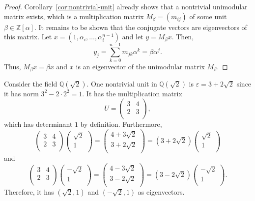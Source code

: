 \begin{proof}
  Corollary~\ref{cor:nontrivial-unit}
  already shows that a nontrivial unimodular matrix exists,
  which is a multiplication matrix $M_β = (m_{ij})$ of some unit $β ∈ ℤ[α]$.
  It remains to be shown that the conjugate vectors are eigenvectors of this matrix.
  Let $x = (1, α_i, …, α_i^{n-1})$ and let $y = M_β x$.
  Then,
  \[
    y_j = \sum_{k=0}^{n-1} m_{jk} α^k = β α^j.
  \]
  Thus, $M_β x = β x$ and $x$ is an eigenvector of the unimodular matrix $M_β$.
\end{proof}

\begin{example}
  \label{ex:sqrt2-unit}
  Consider the field $ℚ(\sqrt{2})$.
  One nontrivial unit in $ℚ(\sqrt{2})$ is $ε = 3 + 2\sqrt{2}$
  since it has norm $3^2 - 2 · 2^2 = 1$.
  It has the multiplication matrix
  \[
    U = \begin{pmatrix}
      3 & 4 \\
      2 & 3 \\
    \end{pmatrix},
  \]
  which has determinant $1$ by definition.
  Furthermore,
  \[
    \begin{pmatrix}
      3 & 4 \\
      2 & 3 \\
    \end{pmatrix}
    \begin{pmatrix}
      \sqrt{2} \\ 1 \\
    \end{pmatrix}
    =
    \begin{pmatrix}
      4 + 3\sqrt{2} \\
      3 + 2\sqrt{2} \\
    \end{pmatrix}
    =
    (3 + 2\sqrt{2})
    \begin{pmatrix}
      \sqrt{2} \\ 1 \\
    \end{pmatrix}
  \]
  and
  \[
    \begin{pmatrix}
      3 & 4 \\
      2 & 3 \\
    \end{pmatrix}
    \begin{pmatrix}
      -\sqrt{2} \\ 1 \\
    \end{pmatrix}
    =
    \begin{pmatrix}
      4 - 3\sqrt{2} \\
      3 - 2\sqrt{2} \\
    \end{pmatrix}
    =
    (3 - 2\sqrt{2})
    \begin{pmatrix}
      -\sqrt{2} \\ 1 \\
    \end{pmatrix}.
  \]
  Therefore, it has $(\sqrt{2}, 1)$ and $(-\sqrt{2}, 1)$ as eigenvectors.
\end{example}
